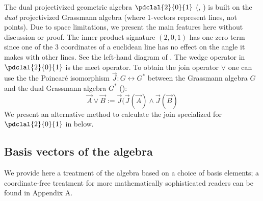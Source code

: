 \documentclass{birkjour}
\begin{document}
 {
The dual projectivized geometric algebra $\pdclal{2}{0}{1}$  (\cite{selig05}, \cite{gunn2011}) is built on the \emph{dual} projectivized Grassmann algebra (where 1-vectors represent lines, not points).   Due to space limitations, we present the main features here without discussion or proof.  The inner product  signature $(2,0,1)$ has one zero term since one of the 3 coordinates of a  euclidean line has no effect on the angle it makes with other lines. See the left-hand diagram of .   The wedge operator in $\pdclal{2}{0}{1}$ is the meet operator.  To obtain the join operator $\vee$ one can use the the Poincar\'{e} isomorphism $\vec{J}: G \leftrightarrow G^{*}$ between the Grassmann algebra  $G$ and the dual Grassmann algebra $G^{*}$ (\cite{gunnThesis}):
\[ \vec{A} \vee \vec{B} := \vec{J}(\vec{J}(\vec{A}) \wedge \vec{J}(\vec{B}) \]  We present an alternative method to calculate the join specialized for $\pdclal{2}{0}{1}$ in  below.
 }
 
%


\subsection{Basis vectors of the algebra}
\label{sec:bva}
We provide here a treatment of the algebra based on a choice of basis elements; a coordinate-free treatment for more mathematically sophisticated readers can be found in Appendix A.
\end{document}
